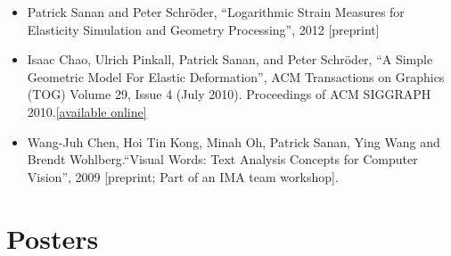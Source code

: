 \documentclass[12pt]{article}
\begin{document}
\begin{itemize}
\item Patrick Sanan and Peter Schr\"{o}der, ``Logarithmic Strain Measures for Elasticity Simulation and Geometry Processing'', 2012 [preprint]
\item Isaac Chao, Ulrich Pinkall, Patrick Sanan, and Peter Schr\"{o}der, ``A Simple Geometric Model For Elastic Deformation'', ACM Transactions on Graphics (TOG) Volume 29, Issue 4 (July 2010). Proceedings of ACM SIGGRAPH 2010.{\href{http://multires.caltech.edu/pubs/GeomElastic.pdf}{[available online]}}
\item Wang-Juh Chen, Hoi Tin Kong, Minah Oh, Patrick Sanan, Ying Wang and Brendt Wohlberg.``Visual Words: Text Analysis Concepts for Computer Vision'', 2009 [preprint; Part of an IMA team workshop].
\end{itemize}

\section*{Posters}
\end{document}
